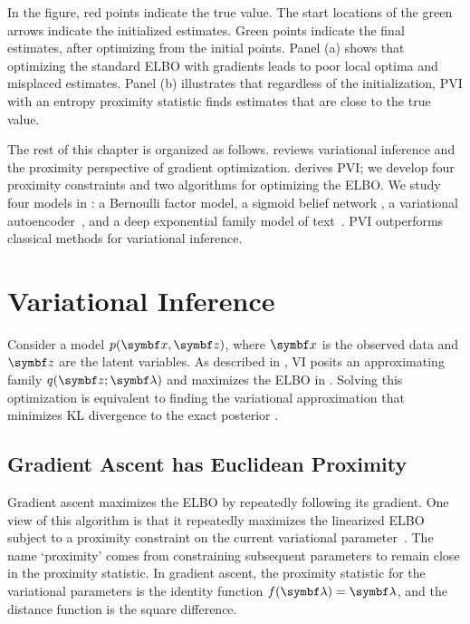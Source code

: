 In the figure, red points indicate the true value. The start locations of the green arrows indicate the initialized estimates. Green points indicate the final estimates, after optimizing from the initial points. Panel (a) shows that optimizing the standard \gls{ELBO} with gradients leads to poor local optima and misplaced estimates.  Panel (b) illustrates that regardless of the initialization, \gls{PVI} with an entropy proximity statistic finds estimates that are close to the true value.

The rest of this chapter is organized as follows.  reviews variational inference and the proximity perspective of gradient optimization.   derives \gls{PVI}; we develop four proximity constraints and two algorithms for optimizing the \gls{ELBO}. We study four models in : a Bernoulli factor model, a sigmoid belief network \citep{Mnih:2016:VIM:3045390.3045621}, a variational autoencoder~\citep{kingma2014autoencoding,rezende2014stochastic}, and a deep exponential family model of text~\citep{ranganath2015deep}. \gls{PVI} outperforms classical methods for variational inference.


\section{Variational Inference}
\label{sec:variational_inference}

Consider a model $p(\mbx, \mbz)$, where $\mbx$ is the observed data and $\mbz$ are the latent variables.  As described in , \gls{VI} posits an approximating family $q(\mbz; \mblambda)$ and maximizes the \gls{ELBO} in . Solving this optimization is equivalent to finding the variational approximation that minimizes \gls{KL} divergence to the exact posterior \citep{jordan1999introduction,wainwright2008graphical}.

\subsection{Gradient Ascent has Euclidean Proximity}
\label{sec:euclidean_proximity}
Gradient ascent maximizes the \gls{ELBO} by repeatedly following its gradient.  One view of this algorithm is that it repeatedly maximizes the linearized \gls{ELBO} subject to a proximity constraint on the current variational parameter~\citep{Spall:2003}. The name `proximity' comes from constraining subsequent parameters to remain close in the proximity statistic. In gradient ascent, the proximity statistic for the variational parameters is the identity function $f(\mblambda) = \mblambda $, and the distance function is the square difference.

